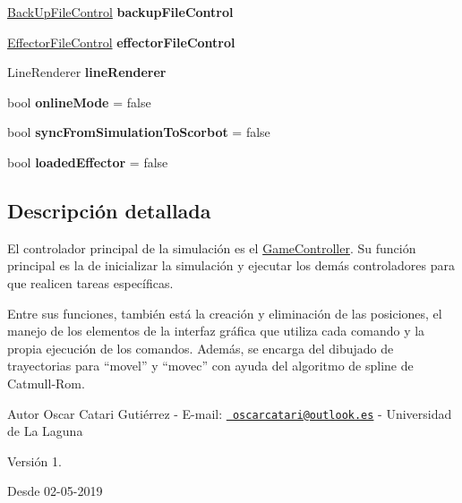 \begin{DoxyCompactItemize}
\mbox{\hyperlink{class_back_up_file_control}{Back\+Up\+File\+Control}} {\bfseries backup\+File\+Control}
\item 
\mbox{\label{class_game_controller_afeecf8ebee5ae570945ee1b1039edc25}} 
\mbox{\hyperlink{class_effector_file_control}{Effector\+File\+Control}} {\bfseries effector\+File\+Control}
\item 
\mbox{\label{class_game_controller_a3bccbef8df8f2586edd74ba0013ec357}} 
Line\+Renderer {\bfseries line\+Renderer}
\item 
\mbox{\label{class_game_controller_a08c2e64ae7139eba0487f697aa298d31}} 
bool {\bfseries online\+Mode} = false
\item 
\mbox{\label{class_game_controller_ad73824064692e5e0e0b51106f962fc16}} 
bool {\bfseries sync\+From\+Simulation\+To\+Scorbot} = false
\item 
\mbox{\label{class_game_controller_a8202d5d6044dc5b77e87f2f742e94da7}} 
bool {\bfseries loaded\+Effector} = false
\end{DoxyCompactItemize}


\subsection{Descripción detallada}
El controlador principal de la simulación es el \mbox{\hyperlink{class_game_controller}{Game\+Controller}}. Su función principal es la de inicializar la simulación y ejecutar los demás controladores para que realicen tareas específicas.

Entre sus funciones, también está la creación y eliminación de las posiciones, el manejo de los elementos de la interfaz gráfica que utiliza cada comando y la propia ejecución de los comandos. Además, se encarga del dibujado de trayectorias para “movel” y “movec” con ayuda del algoritmo de spline de Catmull-\/\+Rom. \begin{DoxyAuthor}{Autor}
Oscar Catari Gutiérrez -\/ E-\/mail\+: \href{mailto:oscarcatari@outlook.es}{\texttt{ oscarcatari@outlook.\+es}} -\/ Universidad de La Laguna 
\end{DoxyAuthor}
\begin{DoxyVersion}{Versión}
1. 
\end{DoxyVersion}
\begin{DoxySince}{Desde}
02-\/05-\/2019 
\end{DoxySince}


